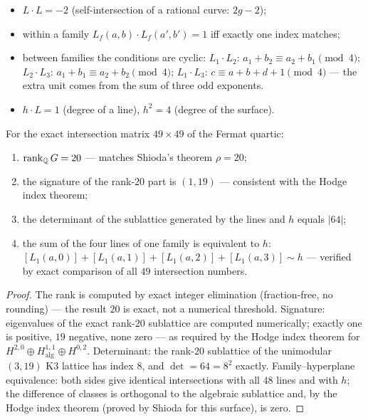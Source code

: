 \begin{itemize}[leftmargin=1.6em]
\item $L\cdot L=-2$ (self-intersection of a rational curve:
  $2g-2$);
\item within a family $L_f(a,b)\cdot L_f(a',b')=1$ iff exactly one
  index matches;
\item between families the conditions are cyclic: $L_1\cdot L_2$:
  $a_1+b_2\equiv a_2+b_1 \pmod 4$; $L_2\cdot L_3$:
  $a_1+b_1\equiv a_2+b_2 \pmod 4$; $L_1\cdot L_3$:
  $c\equiv a+b+d+1\pmod 4$ --- the extra unit comes from the sum of
  three odd exponents.
\item $h\cdot L=1$ (degree of a line), $h^2=4$ (degree of the
  surface).
\end{itemize}

\begin{theorem}\label{th:k3}
For the exact intersection matrix $49\times49$ of the Fermat
quartic:
\begin{enumerate}[leftmargin=2em, itemsep=0.15em]
\item $\operatorname{rank}_{\mathbb{Q}} G = 20$ --- matches Shioda's theorem
  $\rho=20$;
\item the signature of the rank-$20$ part is $(1,19)$ ---
  consistent with the Hodge index theorem;
\item the determinant of the sublattice generated by the lines and
  $h$ equals $|64|$;
\item the sum of the four lines of one family is equivalent to $h$:
  $[L_1(a,0)]+[L_1(a,1)]+[L_1(a,2)]+[L_1(a,3)]\sim h$ --- verified
  by exact comparison of all $49$ intersection numbers.
\end{enumerate}
\end{theorem}

\begin{proof}
The rank is computed by exact integer elimination (fraction-free,
no rounding) --- the result $20$ is exact, not a numerical
threshold. Signature: eigenvalues of the exact rank-$20$ sublattice
are computed numerically; exactly one is positive, $19$ negative,
none zero --- as required by the Hodge index theorem for
$H^{2,0}\oplus H^{1,1}_{\mathrm{alg}}\oplus H^{0,2}$. Determinant:
the rank-$20$ sublattice of the unimodular $(3,19)$ K3 lattice has
index $8$, and $\det=64=8^2$ exactly. Family--hyperplane
equivalence: both sides give identical intersections with all $48$
lines and with $h$; the difference of classes is orthogonal to the
algebraic sublattice and, by the Hodge index theorem (proved by
Shioda for this surface), is zero.
\end{proof}


